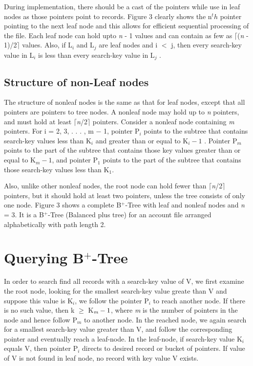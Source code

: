 \documentclass[11pt, oneside, a4paper]{article}
\begin{document}
During implementation, there should be a cast of the pointers while use in leaf nodes as those pointers point to records.  Figure 3 clearly shows the n$^th$ pointer pointing to the next leaf node and this allows for efficient sequential processing of the file.  Each leaf node can hold upto \emph{n} - 1 values and can contain as few as $\lceil$(\emph{n} - 1)/2$\rceil$ values.  Also, if L$_i$ and L$_j$ are leaf nodes and i $<$ j, then every search-key value in L$_i$ is less than every search-key value in L$_j$ . 

\subsection{Structure of non-Leaf nodes}
The structure of nonleaf nodes is the same as that for leaf nodes, except that all pointers are pointers to tree nodes.  A nonleaf node may hold up to \emph{n} pointers, and must hold at least $\lceil$\emph{n}/2$\rceil$ pointers.  Consider a nonleaf node containing \emph{m} pointers.  For i = 2, 3, . . . , m − 1, pointer P$_i$ points to the subtree that contains search-key values less than K$_i$ and greater than or equal to K$_i − 1$ . Pointer P$_m$ points to the part of the subtree that contains those key values greater than or equal to K$_m − 1$, and pointer P$_1$ points to the part of the subtree that contains those search-key values less than K$_1$.

Also, unlike other nonleaf nodes, the root node can hold fewer than $\lceil$\emph{n}/2$\rceil$ pointers, but it should hold at least two pointers, unless the tree consists of only one node.  Figure 3 shows a complete B$^+$-Tree with leaf and nonleaf nodes and \emph{n} = 3.  It is a B$^+$-Tree (Balanced plus tree) for an account file arranged alphabetically with path length 2.

\section{Querying B$^+$-Tree}
In order to search find all records with a search-key value of V, we first examine the root node, looking for the smallest search-key value greate than V and suppose this value is K$_i$, we follow the pointer P$_i$ to reach another node.  If there is no such value, then k $\ge$ K$_\emph{m} - 1$, where \emph{m} is the number of pointers in the node and hence follow P$_m$ to another node.  In the reached node, we again search for a smallest search-key value greater than V, and follow the corresponding pointer and eventually reach a leaf-node.  In the leaf-node, if search-key value K$_i$ equals V, then pointer P$_i$ directs to desired record or bucket of pointers.  If value of V is not found in leaf node, no record with key value V exists.
\end{document}
